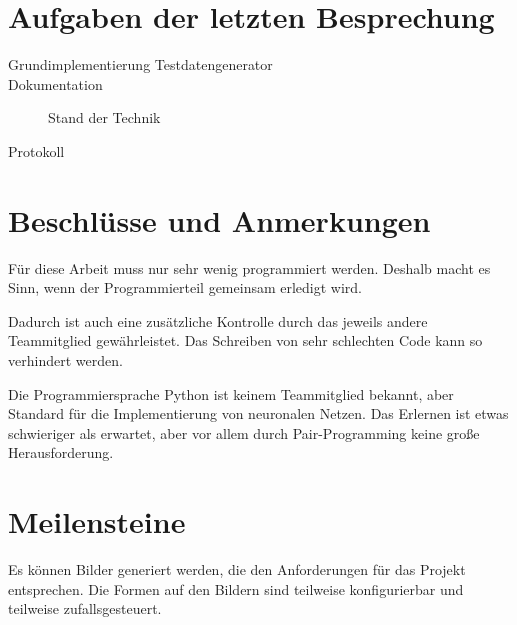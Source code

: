 
\newcommand{\Titel}{3. Protokoll}
\newcommand{\Teilnehmer}{Jonas Bürgel, Patrick Welter}
\newcommand{\DatumUndZeit}{15.11.2021 20:00-20:15}
\newcommand{\Ort}{Discord Meeting}
\newcommand{\Thema}{Entwicklung Testdatengenerator}


\section{Aufgaben der letzten Besprechung}
\begin{description}
	\item[Grundimplementierung Testdatengenerator]  \fullcheck
	\item[Dokumentation] Stand der Technik  \halfcheck
	\item[Protokoll]  \fullcheck
\end{description}

\section{Beschlüsse und Anmerkungen}
\begin{description}[style=nextline]
	\item[Pair-Programming]
	Für diese Arbeit muss nur sehr wenig programmiert werden.
	Deshalb macht es Sinn, wenn der Programmierteil gemeinsam erledigt wird.
	
	Dadurch ist auch eine zusätzliche Kontrolle durch das jeweils andere Teammitglied gewährleistet.
	Das Schreiben von sehr schlechten Code kann so verhindert werden.
	
	\item[Schwierigkeiten mit Python]
	Die Programmiersprache Python ist keinem Teammitglied bekannt, aber Standard für die Implementierung von neuronalen Netzen.
	Das Erlernen ist etwas schwieriger als erwartet, aber vor allem durch Pair-Programming keine große Herausforderung.
\end{description}

\section{Meilensteine}
\begin{description}[style=nextline]
	\item[Grundimplementierung des Testdatengenerators \hfill \fullcheck]
	Es können Bilder generiert werden, die den Anforderungen für das Projekt entsprechen.
	Die Formen auf den Bildern sind teilweise konfigurierbar und teilweise zufallsgesteuert.
\end{description}

